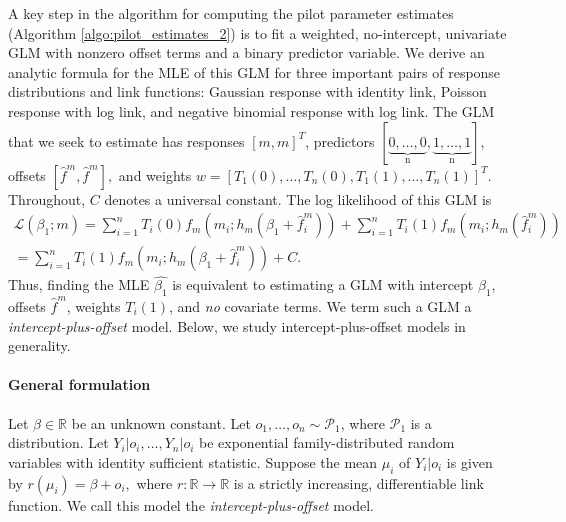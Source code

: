 \documentclass[12pt]{article}
\begin{document}
\begin{appendices}
\begin{refsection}
		A key step in the algorithm for computing the pilot parameter estimates (Algorithm \ref{algo:pilot_estimates_2}) is to fit a weighted, no-intercept, univariate GLM with nonzero offset terms and a binary predictor variable. We derive an analytic formula for the MLE of this GLM for three important pairs of response distributions and link functions: Gaussian response with identity link, Poisson response with log link, and negative binomial response with log link. The GLM that we seek to estimate has responses $[m,m]^T$, predictors $[\underbrace{0, \dots, 0}_\textrm{n}, \underbrace{1, \dots, 1}_\textrm{n}]$, offsets $[\hat{f}^m, \hat{f}^m],$ and weights $w = [T_1(0), \dots, T_n(0), T_1(1), \dots, T_n(1)]^T.$ Throughout, $C$ denotes a universal constant. The log likelihood of this GLM is
		\begin{multline}\label{stat_acc_1}
		\mathcal{L}(\beta_1; m) = \sum_{i=1}^n T_i(0) f_m(m_i; h_m(\beta_1 + \hat{f}^m_i )) + \sum_{i=1}^n T_i(1) f_m(m_i; h_m(\hat{f}^m_i)) \\ = \sum_{i=1}^n T_i(1) f_m(m_i; h_m(\beta_1 + \hat{f}^m_i )) + C.
		\end{multline}
		Thus, finding the MLE $\hat{\beta_1}$ is equivalent to estimating a GLM with intercept $\beta_1$, offsets $\hat{f}^m$, weights $T_i(1)$, and \textit{no} covariate terms. We term such a GLM a \textit{intercept-plus-offset} model. Below, we study intercept-plus-offset models in generality.
		
\paragraph{General formulation}	Let $\beta \in \mathbb{R}$ be an unknown constant. Let $o_1, \dots, o_n \sim \mathcal{P}_1$, where $\mathcal{P}_1$ is a distribution. Let $Y_i|o_i, \dots, Y_n|o_i$ be exponential family-distributed random variables with identity sufficient statistic. Suppose the mean $\mu_i$ of $Y_i|o_i$ is given by $r(\mu_i) = \beta + o_i,$ where $r: \mathbb{R} \to \mathbb{R}$ is a strictly increasing, differentiable link function. We call this model the \textit{intercept-plus-offset} model.
		

\end{refsection}
\end{appendices}
\end{document}
